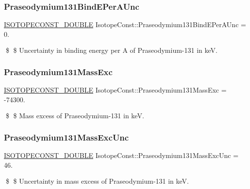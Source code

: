 \subsubsection{\texorpdfstring{Praseodymium131\+Bind\+E\+Per\+A\+Unc}{Praseodymium131BindEPerAUnc}}
{\footnotesize\ttfamily \mbox{\hyperlink{group___isotope_const-_macros_ga8f45a7272ce02c0b4c65c44636ed719a}{I\+S\+O\+T\+O\+P\+E\+C\+O\+N\+S\+T\+\_\+\+D\+O\+U\+B\+LE}} Isotope\+Const\+::\+Praseodymium131\+Bind\+E\+Per\+A\+Unc = 0.}

\$ \$ Uncertainty in binding energy per A of Praseodymium-\/131 in keV. \mbox{\label{group___isotope_const-_praseodymium-_pr131_gadf74e7691fa3a45da38bfb4160fc1e4c}} 
\subsubsection{\texorpdfstring{Praseodymium131\+Mass\+Exc}{Praseodymium131MassExc}}
{\footnotesize\ttfamily \mbox{\hyperlink{group___isotope_const-_macros_ga8f45a7272ce02c0b4c65c44636ed719a}{I\+S\+O\+T\+O\+P\+E\+C\+O\+N\+S\+T\+\_\+\+D\+O\+U\+B\+LE}} Isotope\+Const\+::\+Praseodymium131\+Mass\+Exc = -\/74300.}

\$ \$ Mass excess of Praseodymium-\/131 in keV. \mbox{\label{group___isotope_const-_praseodymium-_pr131_ga6ef71867a868b7389ec48f3206240483}} 
\subsubsection{\texorpdfstring{Praseodymium131\+Mass\+Exc\+Unc}{Praseodymium131MassExcUnc}}
{\footnotesize\ttfamily \mbox{\hyperlink{group___isotope_const-_macros_ga8f45a7272ce02c0b4c65c44636ed719a}{I\+S\+O\+T\+O\+P\+E\+C\+O\+N\+S\+T\+\_\+\+D\+O\+U\+B\+LE}} Isotope\+Const\+::\+Praseodymium131\+Mass\+Exc\+Unc = 46.}

\$ \$ Uncertainty in mass excess of Praseodymium-\/131 in keV. \mbox{\label{group___isotope_const-_praseodymium-_pr131_ga6092ba79c13995ca1e0dd3c82106bf5a}} 
